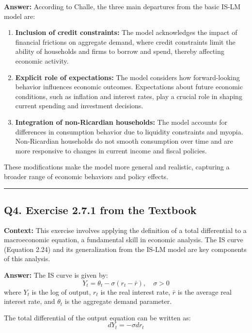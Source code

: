 \documentclass{article}
\begin{document}
\textbf{Answer:}
According to Challe, the three main departures from the basic IS-LM model are:
\begin{enumerate}
    \item \textbf{Inclusion of credit constraints:} The model acknowledges the impact of financial frictions on aggregate demand, where credit constraints limit the ability of households and firms to borrow and spend, thereby affecting economic activity.
    \item \textbf{Explicit role of expectations:} The model considers how forward-looking behavior influences economic outcomes. Expectations about future economic conditions, such as inflation and interest rates, play a crucial role in shaping current spending and investment decisions.
    \item \textbf{Integration of non-Ricardian households:} The model accounts for differences in consumption behavior due to liquidity constraints and myopia. Non-Ricardian households do not smooth consumption over time and are more responsive to changes in current income and fiscal policies.
\end{enumerate}
These modifications make the model more general and realistic, capturing a broader range of economic behaviors and policy effects.

\noindent\rule{\linewidth}{1pt}

\subsection*{Q4. Exercise 2.7.1 from the Textbook}

\textbf{Context:} This exercise involves applying the definition of a total differential to a macroeconomic equation, a fundamental skill in economic analysis. The IS curve (Equation 2.24) and its generalization from the IS-LM model are key components of this analysis.

\textbf{Answer:}
The IS curve is given by:
\begin{equation}
    Y_t = \theta_t - \sigma (r_t - \bar{r}), \quad \sigma > 0
\end{equation}
where \( Y_t \) is the log of output, \( r_t \) is the real interest rate, \( \bar{r} \) is the average real interest rate, and \( \theta_t \) is the aggregate demand parameter. 

The total differential of the output equation can be written as:
\begin{equation}
    dY_t = -\sigma dr_t
\end{equation}
\end{document}
